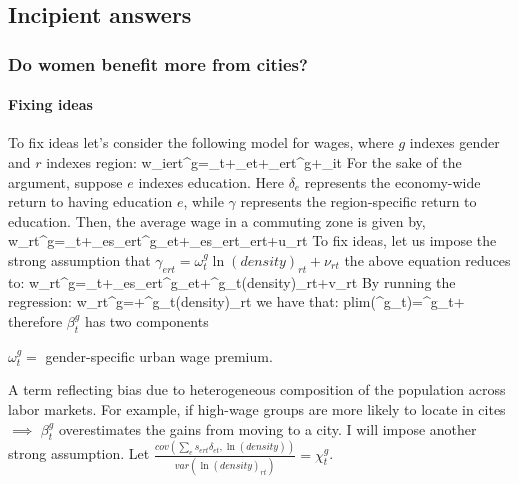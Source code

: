 \subsection{Incipient answers}
\subsubsection{Do women benefit more from cities?}
\paragraph{Fixing ideas}
To fix ideas let's consider the following model for wages, where $g$ indexes gender and $r$ indexes region:
\beqns
	w_{iert}^g=\alpha_t+\delta_{et}+\gamma_{ert}^g+\varepsilon_{it}
\eeqns
For the sake of the argument, suppose $e$ indexes education. Here $\delta_e$ represents the economy-wide return to having education $e$, while $\gamma$ represents the region-specific return to education. Then, the average wage in a commuting zone is given by,
\beqns
		w_{rt}^g=\alpha_t+\sum_es_{ert}^g\delta_{et}+\sum_es_{ert}\gamma_{ert}+u_{rt}
\eeqns
To fix ideas, let us impose the strong assumption that $\gamma_{ert}=\omega^g_t\ln(density)_{rt}+\nu_{rt}$ the above equation reduces to:
\beqns
	w_{rt}^g=\alpha_t+\sum_es_{ert}^g\delta_{et}+\omega^g_t\ln(density)_{rt}+v_{rt}
\eeqns
By running the regression:
\beqns
	w_{rt}^g=\alpha+\beta^g_t\ln(density)_{rt}
\eeqns
we have that:
\beqns
	plim(\beta^g_t)=\omega^g_t+
\eeqns
therefore $\beta^g_t$ has two components
\bitem
	\item $\omega^g_t=$ gender-specific urban wage premium.
	\item A term reflecting bias due to heterogeneous composition of the population across labor markets. For example, if high-wage groups are more likely to locate in cites $\implies$ $\beta^g_t$ overestimates the gains from moving to a city.
\eitem
I will impose another strong assumption. Let $\frac{cov(\sum_es_{ert}\delta_{et},\ln(density))}{var(\ln(density)_{rt})}=\chi^g_t$.


